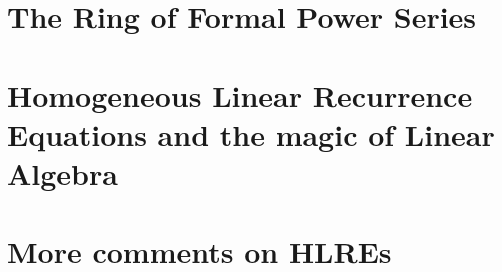 




\section{The Ring of Formal Power Series}


\section{Homogeneous Linear Recurrence Equations and the magic of Linear Algebra}

\section{More comments on HLREs}


